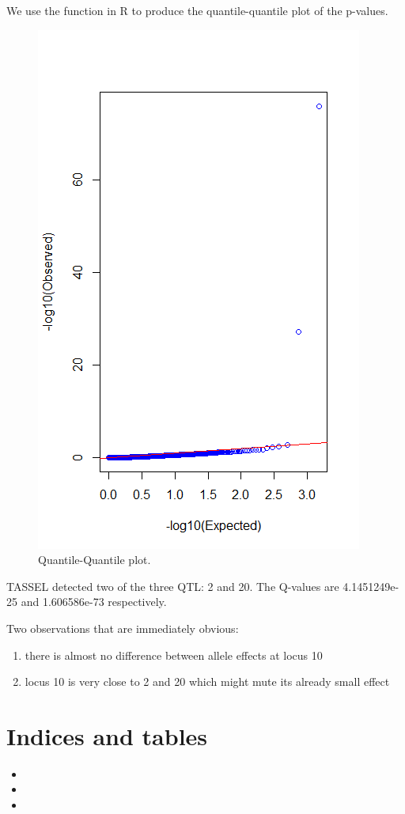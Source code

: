 \documentclass[letterpaper,10pt,english]{sphinxmanual}
\begin{document}
We use the  function in R to produce the quantile-quantile plot of
the p-values.
\begin{figure}[htbp]
\centering
\capstart

\includegraphics{qqplot.png}
\caption{Quantile-Quantile plot.}\end{figure}

TASSEL detected two of the three QTL: 2 and 20.
The Q-values are 4.1451249e-25 and 1.606586e-73 respectively.

Two observations that are immediately obvious:
\begin{enumerate}
\item {} 
there is almost no difference between allele effects at locus 10

\item {} 
locus 10 is very close to 2 and 20 which might mute its already small effect

\end{enumerate}


\chapter{Indices and tables}
\label{contents:indices-and-tables}\begin{itemize}
\item {} 

\item {} 

\item {} 

\end{itemize}



\renewcommand{\indexname}{Index}
\printindex
\end{document}
